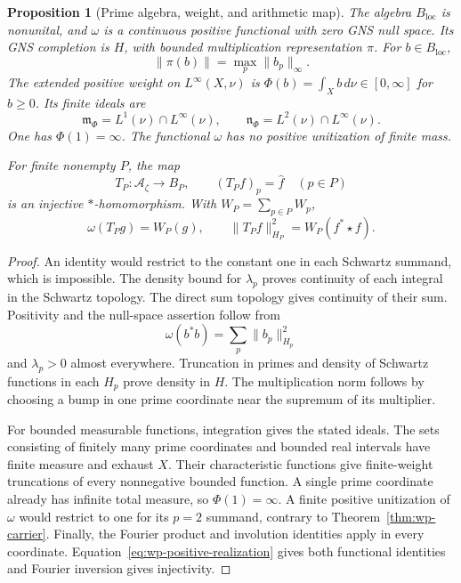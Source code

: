 \documentclass[11pt]{article}
\newtheorem{proposition}[theorem]{Proposition}
\theoremstyle{definition}
\theoremstyle{remark}
\numberwithin{equation}{section}
\newcommand{\cA}{\mathcal A}
\begin{document}
\begin{proposition}[Prime algebra, weight, and arithmetic map]
\label{prop:wc-weight}
The algebra $B_{\mathrm{loc}}$ is nonunital, and $\omega$ is a continuous
positive functional with zero GNS null space.
Its GNS completion is $H$, with bounded multiplication representation $\pi$.
For $b\in B_{\mathrm{loc}}$,
\[
 \|\pi(b)\|=\max_p\|b_p\|_\infty.
\]
The extended positive weight on $L^\infty(X,\nu)$ is
$\Phi(b)=\int_X b\,d\nu\in[0,\infty]$ for $b\geq0$.
Its finite ideals are
\[
 \mathfrak m_\Phi=L^1(\nu)\cap L^\infty(\nu),\qquad
 \mathfrak n_\Phi=L^2(\nu)\cap L^\infty(\nu).
\]
One has $\Phi(1)=\infty$.
The functional $\omega$ has no positive unitization of finite mass.

For finite nonempty $P$, the map
\begin{equation}
 T_P:\cA_\zeta\longrightarrow B_P,\qquad
 (T_Pf)_p=\widehat f\quad(p\in P)
 \label{eq:wc-arithmetic-map}
\end{equation}
is an injective $*$-homomorphism.  With $W_P=\sum_{p\in P}W_p$,
\[
 \omega(T_Pg)=W_P(g),\qquad
 \|T_Pf\|_{H_P}^2=W_P(f^*\star f).
\]
\end{proposition}
\begin{proof}
An identity would restrict to the constant one in each Schwartz summand,
which is impossible.  The density bound for $\lambda_p$ proves continuity
of each integral in the Schwartz topology.  The direct sum topology gives
continuity of their sum.  Positivity and the null-space assertion follow
from
\[
 \omega(b^*b)=\sum_p\|b_p\|_{H_p}^2
\]
and $\lambda_p>0$ almost everywhere.
Truncation in primes and density of Schwartz functions in each $H_p$
prove density in $H$.  The multiplication norm follows by choosing a
bump in one prime coordinate near the supremum of its multiplier.

For bounded measurable functions, integration gives the stated ideals.
The sets consisting of finitely many prime coordinates and bounded real
intervals have finite measure and exhaust $X$.
Their characteristic functions give finite-weight truncations of every
nonnegative bounded function.  A single prime coordinate already has
infinite total measure, so $\Phi(1)=\infty$.
A finite positive unitization of $\omega$ would restrict to one for its
$p=2$ summand, contrary to Theorem~\ref{thm:wp-carrier}.
Finally, the Fourier product and involution identities apply in every
coordinate.  Equation~\eqref{eq:wp-positive-realization} gives both
functional identities and Fourier inversion gives injectivity.
\end{proof}
\end{document}
